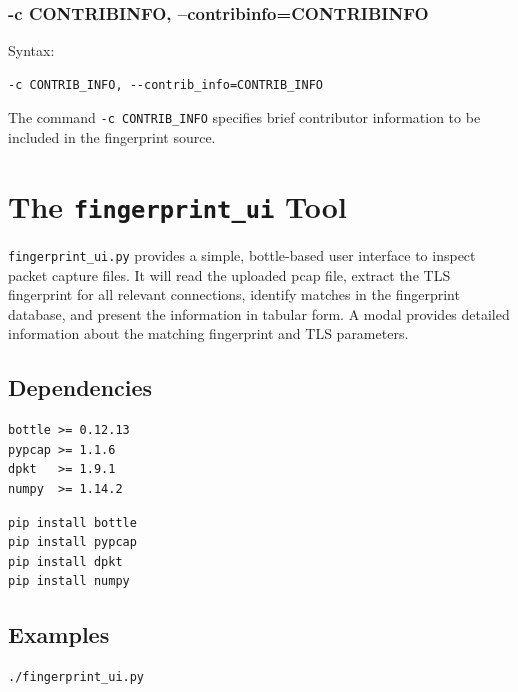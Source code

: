 \documentclass{book}
\begin{document}
\subsection{-c CONTRIB\textunderscore INFO, --contrib\textunderscore info=CONTRIB\textunderscore INFO}
\begin{mdframed}[style=aaa]
Syntax:
  \begin{verbatim}
-c CONTRIB_INFO, --contrib_info=CONTRIB_INFO
  \end{verbatim}
\end{mdframed}
The command \texttt{-c CONTRIB\_INFO} specifies brief contributor information to be included in the fingerprint source.



\chapter{The \texttt{fingerprint\_ui} Tool}

\texttt{fingerprint\_ui.py} provides a simple, bottle-based user interface to inspect packet capture files. It will read the uploaded pcap file, extract the TLS fingerprint for all relevant connections, identify matches in the fingerprint database, and present the information in tabular form. A modal provides detailed information about the matching fingerprint and TLS parameters.

\section{Dependencies}

\begin{mdframed}[style=cli]
\begin{verbatim}
bottle >= 0.12.13
pypcap >= 1.1.6
dpkt   >= 1.9.1
numpy  >= 1.14.2
\end{verbatim}
\end{mdframed}

\begin{mdframed}[style=cli]
\begin{verbatim}
pip install bottle
pip install pypcap
pip install dpkt
pip install numpy
\end{verbatim}
\end{mdframed}

\section{Examples}

\begin{mdframed}[style=cli]
\begin{verbatim}
./fingerprint_ui.py
\end{verbatim}
\end{mdframed}
\end{document}
